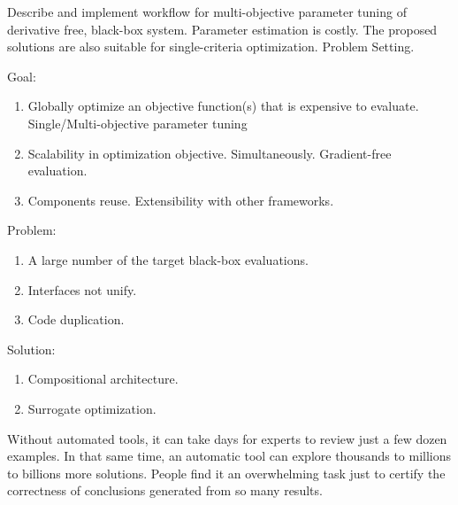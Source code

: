         Describe and implement workflow for multi-objective parameter tuning of derivative free, black-box system. Parameter estimation is costly.
        The proposed solutions are also suitable for single-criteria optimization. Problem Setting.

        Goal:
        \begin{enumerate}
            \item Globally optimize an objective function(s) that is expensive to evaluate. Single/Multi-objective parameter tuning
            \item Scalability in optimization objective. Simultaneously. Gradient-free evaluation.
            \item Components reuse. Extensibility with other frameworks.
        \end{enumerate}

        Problem:
        \begin{enumerate}
            \item A large number of the target black-box evaluations.
            \item Interfaces not unify.
            \item Code duplication.
        \end{enumerate}

        Solution:
        \begin{enumerate}
            \item Compositional architecture.
            \item Surrogate optimization.
        \end{enumerate}



        Without automated tools, it can take days for experts to review just a few dozen examples.  In that same time, an automatic tool can explore thousands to millions to billions more solutions. 
        People find it an overwhelming task just to certify the correctness of conclusions generated from so many results.
